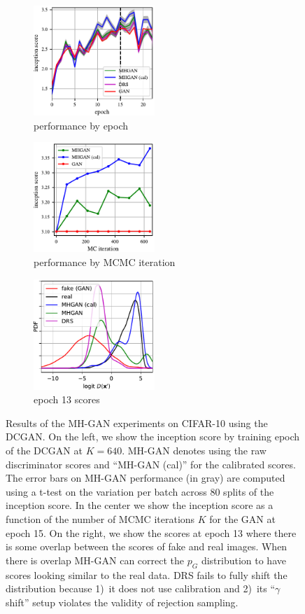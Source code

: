 \documentclass{article}
\newcommand{\PG}{{p_G}}
\begin{document}
\begin{figure}
    \centering
    \begin{subfigure}[b]{0.32\textwidth}
       \centering
       \includegraphics[width=1.8in]{figures/per_epoch.pdf}
       \caption{performance by epoch}
       \label{fig:incep_by_epoch}
    \end{subfigure}
    \begin{subfigure}[b]{0.32\textwidth}
       \centering
       \includegraphics[width=1.8in]{figures/plot_per_mh.pdf}
       \caption{performance by MCMC iteration}
       \label{fig:incep_by_iter}
    \end{subfigure}
    \begin{subfigure}[b]{0.32\textwidth}
       \centering
       \includegraphics[width=1.8in]{figures/score_dist_overlap.pdf}
       \caption{epoch 13 scores}
       \label{fig:score_dist_overlap}
    \end{subfigure}
    \caption{{\small
    Results of the MH-GAN experiments on CIFAR-10 using the DCGAN\@.
    On the left, we show the inception score by training epoch of the DCGAN at $K=640$.
    MH-GAN denotes using the raw discriminator scores and ``MH-GAN (cal)'' for the calibrated scores.
    The error bars on MH-GAN performance (in gray) are computed using a t-test on the variation per batch across 80 splits of the inception score.
    In the center we show the inception score as a function of the number of MCMC iterations $K$ for the GAN at epoch 15.
    On the right, we show the scores at epoch 13 where there is some overlap between the scores of fake and real images.
    When there is overlap MH-GAN can correct the $\PG$ distribution to have scores looking similar to the real data.
    DRS fails to fully shift the distribution because 1)~it does not use calibration and 2)~its ``$\gamma$ shift'' setup violates the validity of rejection sampling.
    }}
\end{figure}
\end{document}
